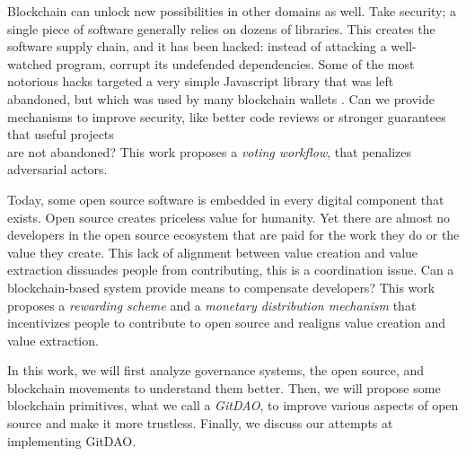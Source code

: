 \leavevmode{}Blockchain can unlock new possibilities in other domains as well.
Take security; a single piece of software generally relies on dozens of libraries.
This creates the software supply chain, and it has been hacked: instead of attacking a well-watched program, corrupt its undefended dependencies.
Some of the most notorious hacks targeted a very simple Javascript library that was left abandoned, but which was used by many blockchain wallets \cite{noauthor_how_nodate}.
Can we provide mechanisms to improve security, like better code reviews or stronger guarantees that useful projects\\are not abandoned?
This work proposes a \emph{voting workflow}, that penalizes adversarial actors.

\leavevmode{}Today, some open source software is embedded in every digital component that exists.
Open source creates priceless value for humanity.
Yet there are almost no developers in the open source ecosystem that are paid for the work they do or the value they create.
This lack of alignment between value creation and value extraction dissuades people from contributing, this is a coordination issue.
Can a blockchain-based system provide means to compensate developers?
This work proposes a \emph{rewarding scheme} and a \emph{monetary distribution mechanism} that incentivizes people to contribute to open source and realigns value creation and value extraction.

\leavevmode{}
In this work, we will first analyze governance systems, the open source, and blockchain movements to understand them better.
Then, we will propose some blockchain primitives, what we call a \emph{GitDAO}, to improve various aspects of open source and make it more trustless.
Finally, we discuss our attempts at implementing GitDAO.

